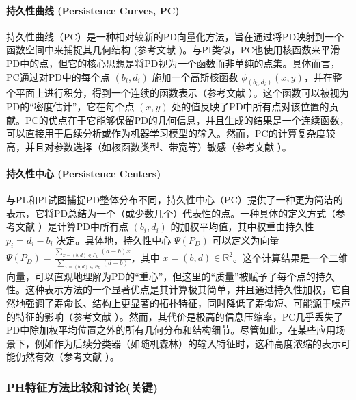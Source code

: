             \paragraph{持久性曲线 (Persistence Curves, PC)}
                \label{sec:feat_pc}
                持久性曲线（PC）是一种相对较新的PD向量化方法，旨在通过将PD映射到一个函数空间中来捕捉其几何结构 (参考文献 \cite{source:17, source:595})。与PI类似，PC也使用核函数来平滑PD中的点，但它的核心思想是将PD视为一个函数而非单纯的点集。具体而言，PC通过对PD中的每个点 $(b_i, d_i)$ 施加一个高斯核函数 $\phi_{(b_i, d_i)}(x, y)$，并在整个平面上进行积分，得到一个连续的函数表示（参考文献 \cite{source:66}）。这个函数可以被视为PD的“密度估计”，它在每个点 $(x, y)$ 处的值反映了PD中所有点对该位置的贡献。PC的优点在于它能够保留PD的几何信息，并且生成的结果是一个连续函数，可以直接用于后续分析或作为机器学习模型的输入。然而，PC的计算复杂度较高，并且对参数选择（如核函数类型、带宽等）敏感（参考文献 \cite{source:88}）。
            \paragraph{持久性中心 (Persistence Centers)}
                \label{sec:feat_pcen}
                与PL和PI试图捕捉PD整体分布不同，持久性中心（PC）提供了一种更为简洁的表示，它将PD总结为一个（或少数几个）代表性的点。一种具体的定义方式（参考文献 \cite{source:528, source:531}）是计算PD中所有点 $(b_i, d_i)$ 的加权平均值，其中权重由持久性 $p_i = d_i - b_i$ 决定。具体地，持久性中心 $\Psi(P_D)$ 可以定义为向量 $\Psi(P_D) = \frac{\sum_{x=(b,d) \in P_D} (d-b) x}{\sum_{x=(b,d) \in P_D} (d-b)}$，其中 $x = (b, d) \in \mathbb{R}^2$。这个计算结果是一个二维向量，可以直观地理解为PD的“重心”，但这里的“质量”被赋予了每个点的持久性。这种表示方法的一个显著优点是其计算极其简单，并且通过持久性加权，它自然地强调了寿命长、结构上更显著的拓扑特征，同时降低了寿命短、可能源于噪声的特征的影响（参考文献 \cite{source:531}）。然而，其代价是极高的信息压缩率，PC几乎丢失了PD中除加权平均位置之外的所有几何分布和结构细节。尽管如此，在某些应用场景下，例如作为后续分类器（如随机森林）的输入特征时，这种高度浓缩的表示可能仍然有效（参考文献 \cite{source:515, source:531}）。

        \subsubsection{PH特征方法比较和讨论(关键)}
            \label{sec:tda_features_discussion}

